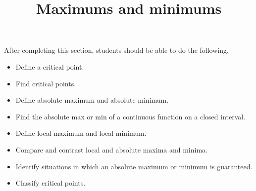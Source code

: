 \documentclass{ximera}
\title{Maximums and minimums}
\begin{document}
\begin{abstract}
\end{abstract}

\maketitle

\begin{sectionOutcomes}

After completing this section, students should be able to do the following.

\begin{itemize}
	\item Define a critical point.
	\item Find critical points.
	\item Define absolute maximum and absolute minimum.
	\item Find the absolute max or min of a continuous function on a closed interval.
	\item Define local maximum and local minimum.
	\item Compare and contrast local and absolute maxima and minima.
	\item Identify situations in which an absolute maximum or minimum is guaranteed.
	\item Classify critical points.
\end{itemize}

\end{sectionOutcomes}
\end{document}
